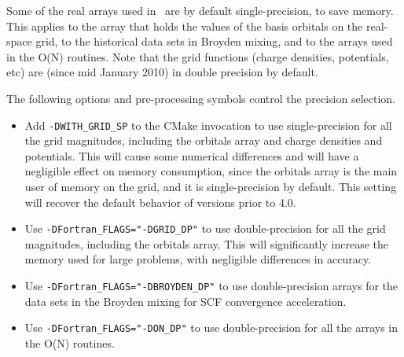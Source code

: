 Some of the real arrays used in \siesta\ are by default
single-precision, to save memory. This applies to the array that holds
the values of the basis orbitals on the real-space grid, to the
historical data sets in Broyden mixing, and to the arrays used in the
O(N) routines. Note that the grid functions (charge densities,
potentials, etc) are (since mid January 2010) in double
precision by default.

The following options and pre-processing symbols control the
precision selection.

\begin{itemize}

  \item Add \texttt{-DWITH\_GRID\_SP} to the CMake invocation to use
    single-precision for all the grid magnitudes, including the
    orbitals array and charge densities and potentials.  This will
    cause some numerical differences and will have a negligible effect
    on memory consumption, since the orbitals array is the main user
    of memory on the grid, and it is single-precision by default. This
    setting will recover the default behavior of versions prior to
    4.0.


  \item Use \texttt{-DFortran\_FLAGS="-DGRID\_DP"} to use
    double-precision for all the grid magnitudes, including the
    orbitals array. This will significantly increase the memory used
    for large problems, with negligible differences in accuracy.


  \item Use \texttt{-DFortran\_FLAGS="-DBROYDEN\_DP"} to use
    double-precision arrays for the data sets in the Broyden mixing
    for SCF convergence acceleration.

  \item Use \texttt{-DFortran\_FLAGS="-DON\_DP"} to use
    double-precision for all the arrays in the O(N) routines.

\end{itemize}